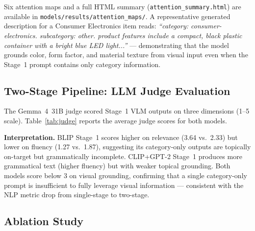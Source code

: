 \documentclass[12pt,a4paper]{article}
\begin{document}
Six attention maps and a full HTML summary (\texttt{attention\_summary.html}) are
available in \texttt{models/results/attention\_maps/}. A representative generated
description for a Consumer Electronics item reads: \emph{``category: consumer-electronics.
subcategory: other. product features include a compact, black plastic container with a
bright blue LED light...''} --- demonstrating that the model grounds color, form factor,
and material texture from visual input even when the Stage~1 prompt contains only
category information.

\subsection{Two-Stage Pipeline: LLM Judge Evaluation}

The Gemma~4~31B judge scored Stage~1 VLM outputs on three dimensions (1--5 scale).
Table~\ref{tab:judge} reports the average judge scores for both models.

\begin{table}[H]
\centering
\caption{Gemma~4~31B judge scores for Stage~1 VLM outputs (mean over 135 test items, scale 1--5).}
\label{tab:judge}
\end{table}

\textbf{Interpretation.} BLIP Stage~1 scores higher on relevance (3.64 vs.\ 2.33) but lower
on fluency (1.27 vs.\ 1.87), suggesting its category-only outputs are topically on-target
but grammatically incomplete. CLIP+GPT-2 Stage~1 produces more grammatical text (higher
fluency) but with weaker topical grounding. Both models score below 3 on visual grounding,
confirming that a single category-only prompt is insufficient to fully leverage visual
information --- consistent with the NLP metric drop from single-stage to two-stage.

\subsection{Ablation Study}
\end{document}

